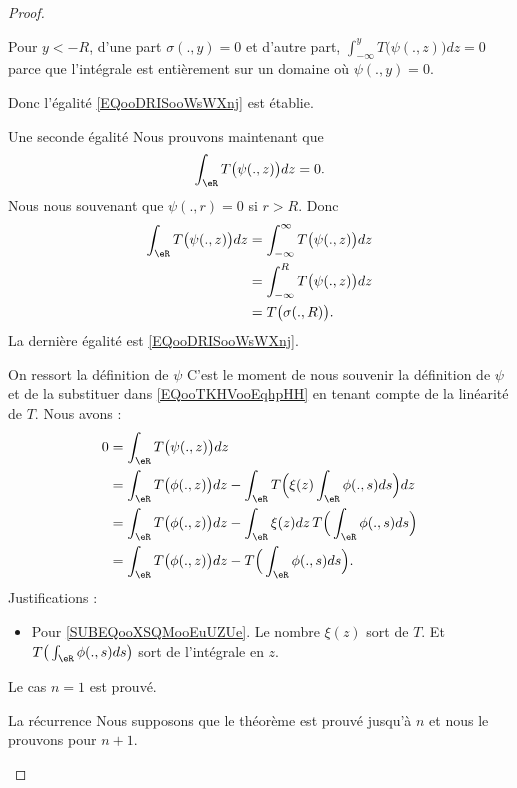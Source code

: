 \begin{proof}
\begin{subproof}
\begin{subproof}
           Pour \( y<-R\), d'une part \( \sigma(.,y)=0\) et d'autre part, \( \int_{-\infty}^yT\big( \psi(.,z) \big)dz=0\) parce que l'intégrale est entièrement sur un domaine où \( \psi(.,y)=0\).

           Donc l'égalité \eqref{EQooDRISooWsWXnj} est établie.

       \item[Une seconde égalité]
           Nous prouvons maintenant que
           \begin{equation}     \label{EQooTKHVooEqhpHH}
               \int_{\eR}T\big( \psi(.,z) \big)dz=0.
           \end{equation}
           Nous nous souvenant que \( \psi(.,r)=0\) si \( r>R\). Donc
           \begin{subequations}
               \begin{align}
                   \int_{\eR}T\big( \psi(.,z) \big)dz&=\int_{-\infty}^{\infty}T\big( \psi(.,z) \big)dz\\
                   &=\int_{-\infty}^RT\big( \psi(.,z) \big)dz\\
                   &=T\big( \sigma(.,R) \big).
               \end{align}
           \end{subequations}
           La dernière égalité est \eqref{EQooDRISooWsWXnj}.

       \item[On ressort la définition de \( \psi\)]
           C'est le moment de nous souvenir la définition de \( \psi\) et de la substituer dans \eqref{EQooTKHVooEqhpHH} en tenant compte de la linéarité de \( T\). Nous avons :
           \begin{subequations}
               \begin{align}
                   0&=\int_{\eR}T\big( \psi(.,z) \big)dz\\
                   &=\int_{\eR}T\big( \phi(.,z) \big)dz-\int_{\eR}T\Big( \xi(z)\int_{\eR}\phi(.,s)ds \Big)dz\\
                   &=\int_{\eR}T\big( \phi(.,z) \big)dz-\int_{\eR}\xi(z)dz\,T\Big( \int_{\eR}\phi(.,s)ds \Big) \label{SUBEQooXSQMooEuUZUe} \\
                   &=\int_{\eR}T\big( \phi(.,z) \big)dz-T\Big( \int_{\eR}\phi(.,s)ds \Big).
               \end{align}
           \end{subequations}
           Justifications :
           \begin{itemize}
               \item Pour \eqref{SUBEQooXSQMooEuUZUe}. Le nombre \( \xi(z)\) sort de \( T\). Et \( T\big( \int_{\eR}\phi(.,s)ds \big)\) sort de l'intégrale en \( z\).
           \end{itemize}
           Le cas \( n=1\) est prouvé.
        \end{subproof}
    \item[La récurrence]
        Nous supposons que le théorème est prouvé jusqu'à \( n\) et nous le prouvons pour \( n+1\). 


\end{subproof}
\end{proof}
